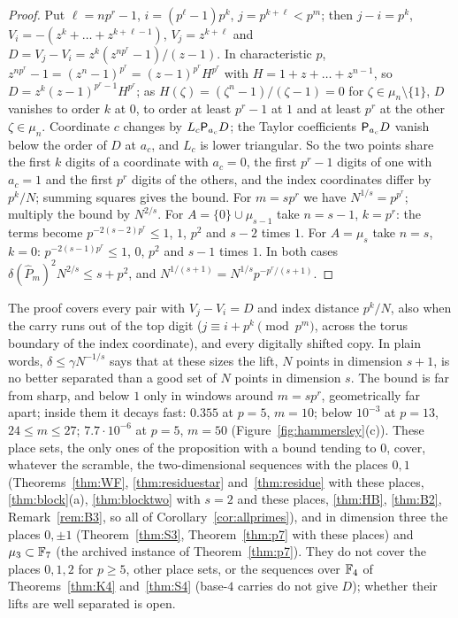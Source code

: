 \begin{proof}
Put $\ell=np^r-1$, $i=(p^\ell-1)p^k$, $j=p^{k+\ell}<p^m$; then $j-i=p^k$, $V_i=-(z^k+\dots+z^{k+\ell-1})$, $V_j=z^{k+\ell}$ and $D=V_j-V_i=z^k(z^{np^r}-1)/(z-1)$.
In characteristic $p$, $z^{np^r}-1=(z^n-1)^{p^r}=(z-1)^{p^r}H^{p^r}$ with $H=1+z+\dots+z^{n-1}$, so $D=z^k(z-1)^{p^r-1}H^{p^r}$; as $H(\zeta)=(\zeta^n-1)/(\zeta-1)=0$ for $\zeta\in\mu_n\setminus\{1\}$, $D$ vanishes to order $k$ at $0$, to order at least $p^r-1$ at $1$ and at least $p^r$ at the other $\zeta\in\mu_n$. Coordinate $c$ changes by $L_c\mathsf{P}_{a_c}D$; the Taylor coefficients $\mathsf{P}_{a_c}D$ vanish below the order of $D$ at $a_c$, and $L_c$ is lower triangular. So the two points share the first $k$ digits of a coordinate with $a_c=0$, the first $p^r-1$ digits of one with $a_c=1$ and the first $p^r$ digits of the others, and the index coordinates differ by $p^k/N$; summing squares gives the bound. For $m=sp^r$ we have $N^{1/s}=p^{p^r}$; multiply the bound by $N^{2/s}$. For $A=\{0\}\cup\mu_{s-1}$ take $n=s-1$, $k=p^r$: the terms become $p^{-2(s-2)p^r}\le1$, $1$, $p^2$ and $s-2$ times $1$. For $A=\mu_s$ take $n=s$, $k=0$: $p^{-2(s-1)p^r}\le1$, $0$, $p^2$ and $s-1$ times $1$. In both cases $\delta(\hat P_m)^2N^{2/s}\le s+p^2$, and $N^{1/(s+1)}=N^{1/s}p^{-p^r/(s+1)}$.
\end{proof}

The proof covers every pair with $V_j-V_i=D$ and index distance $p^k/N$, also when the carry runs out of the top digit ($j\equiv i+p^k\pmod{p^m}$, across the torus boundary of the index coordinate), and every digitally shifted copy. In plain words, $\delta\le\gamma N^{-1/s}$ says that at these sizes the lift, $N$ points in dimension $s+1$, is no better separated than a good set of $N$ points in dimension $s$. The bound is far from sharp, and below $1$ only in windows around $m=sp^r$, geometrically far apart; inside them it decays fast: $0.355$ at $p=5$, $m=10$; below $10^{-3}$ at $p=13$, $24\le m\le27$; $7.7\cdot10^{-6}$ at $p=5$, $m=50$ (Figure~\ref{fig:hammersley}(c)). These place sets, the only ones of the proposition with a bound tending to $0$, cover, whatever the scramble, the two-dimensional sequences with the places $0,1$ (Theorems~\ref{thm:WF}, \ref{thm:residuestar} and~\ref{thm:residue} with these places, \ref{thm:block}(a), \ref{thm:blocktwo} with $s=2$ and these places, \ref{thm:HB}, \ref{thm:B2}, Remark~\ref{rem:B3}, so all of Corollary~\ref{cor:allprimes}), and in dimension three the places $0,\pm1$ (Theorem~\ref{thm:S3}, Theorem~\ref{thm:p7} with these places) and $\mu_3\subset\mathbb{F}_7$ (the archived instance of Theorem~\ref{thm:p7}). They do not cover the places $0,1,2$ for $p\ge5$, other place sets, or the sequences over $\mathbb{F}_4$ of Theorems~\ref{thm:K4} and~\ref{thm:S4} (base-$4$ carries do not give $D$); whether their lifts are well separated is open.

